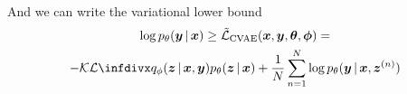 And we can write the variational lower bound
\begin{multline}
\log \ptheta\given{\vy}{\vx} \geq \mathcal{\tilde{L}}_{\text{CVAE}}(\vx, \vy, \vth, \vph) =\\
- \KL{q_{\phi}\given{\vz}{\vx, \vy}}{\ptheta \given{\vz}{\vx}} + \frac{1}{N} \sum^N_{n=1} \log \ptheta \given{\vy}{\vx, \vz^{(n)}}
\end{multline}

